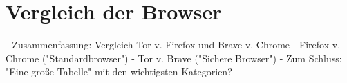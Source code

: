 \chapter{Vergleich der Browser}

- Zusammenfassung: Vergleich Tor v. Firefox und Brave v. Chrome
- Firefox v. Chrome ("Standardbrowser")
- Tor v. Brave ("Sichere Browser")
- Zum Schluss: "Eine große Tabelle" mit den wichtigsten Kategorien?